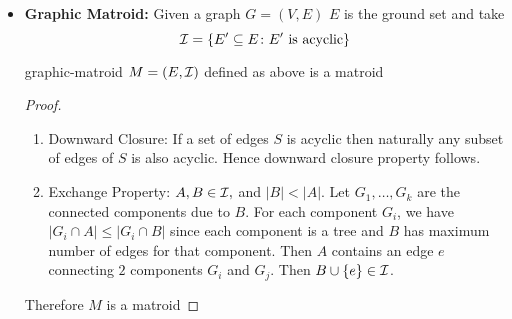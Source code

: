 \begin{itemize}[label=$\bullet$]
\begin{proof}
\begin{enumerate}[label=\bfseries\tiny\protect\circled{\small\arabic*}]
		 Now we take a look at the chain $\sL_{e_i}$. For brevity we will use $e$ instead of $e_i$. So in the chain $\sL_e=\{L_1,\dots, L_n\}$ such that  we have $$L_n\supseteq L_{n-1}\supseteq \cdots \supseteq L_2\supseteq L_1$$Then take $i\in[n]$ to be the largest index such that $|A\cap L_i|\leq |B\cap L_i|$. There will be such index because otherwise we will have $|A|\leq |B|$ which is not possible. Then take $e^*\in (A\cap L_{i+1})-(L_i\cup B)$. Such an $e^*$ will exist because $|A\cap L_{i+1}|>|A\cap L_{i+1}|\implies A\cap (L_{i+1}- L_{i}\neq \emptyset$ and also $A\cap (L_{i+1}- L_{i}\not\subseteq B\cap (L_{i+1}-L_i)$ because otherwise we will have $$|A\cap L_{i+1}|=|A\cap (L_{i+1}- L_{i}|+|A\cap L_{i+1}|\leq |B\cap (L_{i+1}-L_i)|+|B\cap L_i|=|B\cap L_{i+1}|$$which is not possible. Hence there exists $e^*$ such that $e^*\in (A\cap L_{i+1})-(L_i\cup B)$. Therefore take $B^*=B\cup \{e^*\}$. Then for all $j< i$ we have $B^*\cap L_j=B\cap L_j$ so we don't have a problem there. Now for all $j\geq i$ we have $|A\cap L_j|>|B\cap L_j|$. Hence now $|B^*\cap L_j|\leq |B\cap L_j|+1\leq |A\cap L_j|\leq k(L_j)$. Therefore we have $B^*\in\mcI$. Hence the exchange property follows.
	\end{enumerate}
Therefore $M$ is a matroid.
\end{proof}
\item \textbf{Graphic Matroid:} Given a graph $G=(V,E)$ $E$ is the ground set and take $$\mathcal{I}=\{E'\subseteq E\colon E'\text{ is acyclic} \}$$
\begin{lemma}{}{graphic-matroid}
	$M=(E,\mathcal{I})$ defined as above is a matroid
\end{lemma}
\begin{proof}
	\begin{enumerate}[label=\bfseries\tiny\protect\circled{\small\arabic*}]
		\item Downward Closure: If a set of edges $S$ is acyclic then naturally any subset of edges of $S$ is also acyclic. Hence downward closure property follows.
		\item Exchange Property: $A,B\in\mathcal{I},$ and $ |B|<|A|$. Let $G_1,\dots, G_k$ are the connected components due to $B$. For each component $G_i$, we have $|G_i\cap A|\leq |G_i\cap B|$ since each component is a tree and $B$ has maximum number of edges for that component. Then $A$ contains an edge $e$ connecting $2$ components $G_i$ and $G_j$. Then $B\cup \{e\}\in \mathcal{I}$. 
	\end{enumerate}Therefore $M$ is a matroid
\end{proof}


\end{itemize}
